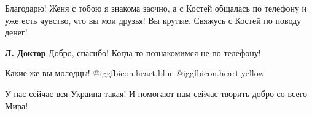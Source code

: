 \begin{itemize}

Благодарю! Женя с тобою я знакома заочно, а с Костей общалась по телефону и уже
есть чувство, что вы мои друзья! Вы крутые. Свяжусь с Костей по поводу денег!

\textbf{Л. Доктор} Добро, спасибо! Когда-то познакомимся не по телефону!

Какие же вы молодцы! @igg{fbicon.heart.blue}  @igg{fbicon.heart.yellow} 

У нас сейчас вся Украина такая! И помогают нам сейчас творить добро со всего Мира!

\end{itemize} %
